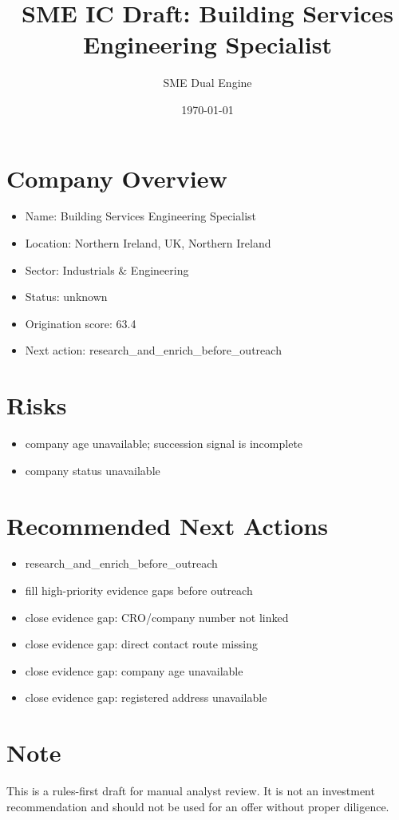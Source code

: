 \documentclass[11pt,a4paper]{article}
\title{SME IC Draft: Building Services Engineering Specialist}
\author{SME Dual Engine}
\date{\today}
\begin{document}
\maketitle
\section*{Company Overview}
\begin{itemize}[leftmargin=1.4em]
\item Name: Building Services Engineering Specialist
\item Location: Northern Ireland, UK, Northern Ireland
\item Sector: Industrials \& Engineering
\item Status: unknown
\item Origination score: 63.4
\item Next action: research\_and\_enrich\_before\_outreach
\end{itemize}
\section*{Risks}
\begin{itemize}[leftmargin=1.4em]
\item company age unavailable; succession signal is incomplete
\item company status unavailable
\end{itemize}
\section*{Recommended Next Actions}
\begin{itemize}[leftmargin=1.4em]
\item research\_and\_enrich\_before\_outreach
\item fill high-priority evidence gaps before outreach
\item close evidence gap: CRO/company number not linked
\item close evidence gap: direct contact route missing
\item close evidence gap: company age unavailable
\item close evidence gap: registered address unavailable
\end{itemize}
\section*{Note}
This is a rules-first draft for manual analyst review. It is not an investment
recommendation and should not be used for an offer without proper diligence.
\end{document}
